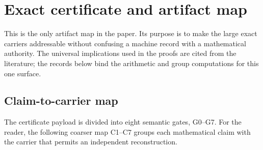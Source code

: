 \section{Exact certificate and artifact map}
\label{app:certificate}

This is the only artifact map in the paper.  Its purpose is to make the
large exact carriers addressable without confusing a machine record with a
mathematical authority.  The universal implications used in the proofs are
cited from the literature; the records below bind the arithmetic and group
computations for this one surface.

\subsection{Claim-to-carrier map}

The certificate payload is divided into eight semantic gates, G0--G7.  For
the reader, the following coarser map C1--C7 groups each mathematical claim
with the carrier that permits an independent reconstruction.

